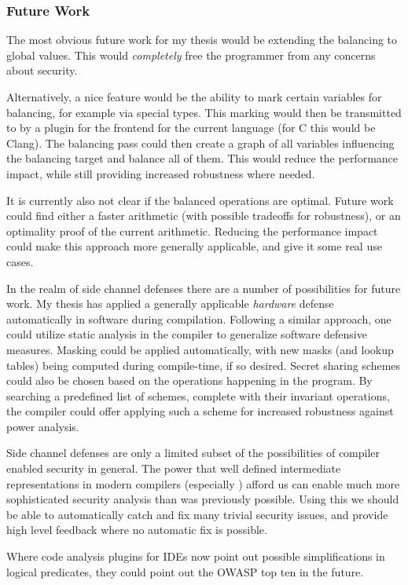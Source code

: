 \subsubsection{Future Work}
The most obvious future work for my thesis would be extending the balancing to global values.
This would \emph{completely} free the programmer from any concerns about security.

Alternatively, a nice feature would be the ability to mark certain variables for balancing, for example via special types.
This marking would then be transmitted to \ir{} by a plugin for the frontend for the current language (for C this would be Clang).
The balancing pass could then create a graph of all variables influencing the balancing target and balance all of them.
This would reduce the performance impact, while still providing increased robustness where needed.

It is currently also not clear if the balanced operations are optimal.
Future work could find either a faster arithmetic (with possible tradeoffs for robustness), or an optimality proof of the current arithmetic.
Reducing the performance impact could make this approach more generally applicable, and give it some real use cases.

In the realm of side channel defenses there are a number of possibilities for future work.
My thesis has applied a generally applicable \emph{hardware} defense automatically in software during compilation.
Following a similar approach, one could utilize static analysis in the compiler to generalize software defensive measures.
Masking could be applied automatically, with new masks (and lookup tables) being computed during compile-time, if so desired.
Secret sharing schemes could also be chosen based on the operations happening in the program.
By searching a predefined list of schemes, complete with their invariant operations, the compiler could offer applying such a scheme for increased robustness against power analysis.

Side channel defenses are only a limited subset of the possibilities of compiler enabled security in general.
The power that well defined intermediate representations in modern compilers (especially \ir{}) afford us can enable much more sophisticated security analysis than was previously possible.
Using this we should be able to automatically catch and fix many trivial security issues, and provide high level feedback where no automatic fix is possible.

Where code analysis plugins for IDEs now point out possible simplifications in logical predicates, they could point out the OWASP top ten in the future.
